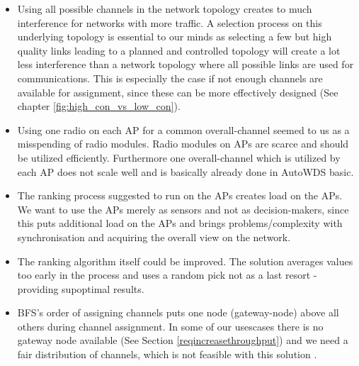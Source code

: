     \begin{itemize}
      \item Using all possible channels in the network topology creates to much interference for networks with more traffic.
	A selection process on this underlying topology is essential to our minds as selecting a few but high quality links
	leading to a planned and controlled topology will create a lot less interference than a network topology where all possible 
	links are used for communications. This is especially the case if not enough channels are available for assignment, since 
	these can be more effectively designed (See chapter \ref{fig:high_con_vs_low_con}).
	\label{topologypreservingdealbreaker}
	
      \item Using one radio on each \ac{AP} for a common overall-channel seemed to us as a misspending of radio modules.
	Radio modules on APs are scarce and should be utilized efficiently. 
	Furthermore one overall-channel which is utilized by each \ac{AP} does not scale well and is basically already done in AutoWDS basic.
	
      \item The ranking process suggested to run on the APs creates load on the APs.
	We want to use the APs merely as sensors and not as decision-makers, 
	since this puts additional load on the APs and brings problems/complexity with synchronisation and
	acquiring the overall view on the network.
	
      \item The ranking algorithm itself could be improved. 
	The solution averages values too early in the process and uses a random pick not as a last resort - providing supoptimal results.
	
      \item \ac{BFS}'s order of assigning channels puts one node (gateway-node) above all others during channel assignment.
	In some of our usescases there is no gateway node available (See Section \ref{reqincreasethroughput}) and we need a fair distribution of channels, 
	which is not feasible with this solution \cite{overview_caa}.
    \end{itemize}


